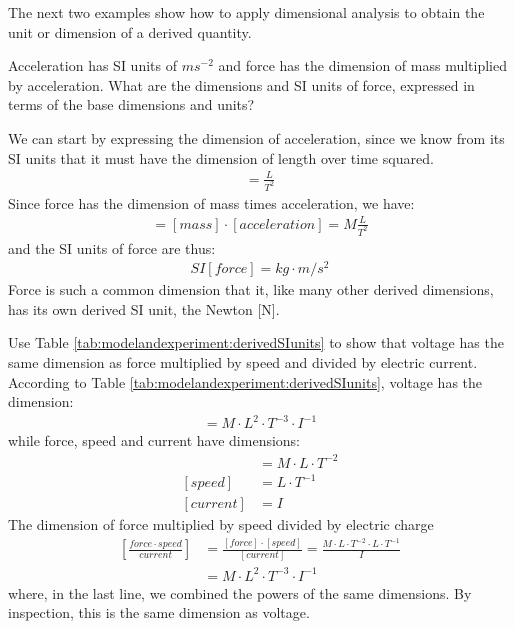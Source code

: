 The next two examples show how to apply dimensional analysis to obtain the unit or dimension of a derived quantity. 

\begin{example}{\label{ex:modelandexperiment:forceSI} Acceleration has SI units of $\si{ms^{-2}}$ and force has the dimension of mass multiplied by acceleration. What are the dimensions and SI units of force, expressed in terms of the base dimensions and units?}

We can start by expressing the dimension of acceleration, since we know from its SI units that it must have the dimension of length over time squared.
\begin{align*}
[acceleration] = \frac{L}{T^2}
\end{align*}
Since force has the dimension of mass times acceleration, we have:
\begin{align*}
[force] = [mass]\cdot[acceleration] = M \frac{L}{T^2}
\end{align*}
and the SI units of force are thus:
\begin{align*}
SI[force] = \si{kg}\cdot\si{m/s^2}
\end{align*}
Force is such a common dimension that it, like many other derived dimensions, has its own derived SI unit, the Newton [N].
\end{example}
\newpage
\begin{example}{Use Table \ref{tab:modelandexperiment:derivedSIunits} to show that voltage has the same dimension as force multiplied by speed and divided by electric current.}
According to Table \ref{tab:modelandexperiment:derivedSIunits}, voltage has the dimension:
\begin{align*}
[voltage]=M\cdot L^2 \cdot T^{-3}\cdot I^{-1}
\end{align*}
while force, speed and current have dimensions:
\begin{align*}
[force]&=M\cdot L\cdot T^{-2} \\
[speed]&=L\cdot T^{-1}\\
[current]&=I
\end{align*}
The dimension of force multiplied by speed divided by electric charge
\begin{align*}
\left[\frac{force\cdot speed}{current}\right]&=\frac{[force]\cdot [speed]}{[current]}=\frac{M\cdot L\cdot T^{-2} \cdot L\cdot T^{-1} }{I}\\
&=M\cdot L^2 \cdot T^{-3}\cdot I^{-1}
\end{align*}
where, in the last line, we combined the powers of the same dimensions. By inspection, this is the same dimension as voltage.
\end{example}

